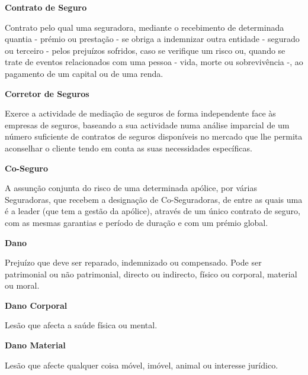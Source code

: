 \begin{description}
\item \textbf{Contrato de Seguro}

Contrato pelo qual uma seguradora, mediante o recebimento de determinada quantia - prémio ou prestação - se obriga a indemnizar outra entidade - segurado ou terceiro - pelos prejuízos sofridos, caso se verifique um risco ou, quando se trate de eventos relacionados com uma pessoa - vida, morte ou sobrevivência -, ao pagamento de um capital ou de uma renda.
\end{description}

\begin{description}
\item \textbf{Corretor de Seguros}

Exerce a actividade de mediação de seguros de forma independente face às empresas de seguros, baseando a sua actividade numa análise imparcial de um número suficiente de contratos de seguros disponíveis no mercado que lhe permita aconselhar o cliente tendo em conta as suas necessidades específicas.
\end{description}

\begin{description}
\item \textbf{Co-Seguro}

A assunção conjunta do risco de uma determinada apólice, por várias Seguradoras, que recebem a designação de Co-Seguradoras, de entre as quais uma é a leader (que tem a gestão da apólice), através de um único contrato de seguro, com as mesmas garantias e período de duração e com um prémio global.
\end{description}

\begin{description}
\item \textbf{Dano}

Prejuízo que deve ser reparado, indemnizado ou compensado. Pode ser patrimonial ou não patrimonial, directo ou indirecto, físico ou corporal, material ou moral.
\end{description}

\begin{description}
\item \textbf{Dano Corporal}

Lesão que afecta a saúde física ou mental.
\end{description}

\begin{description}
\item \textbf{Dano Material}

Lesão que afecte qualquer coisa móvel, imóvel, animal ou interesse jurídico.
\end{description}


